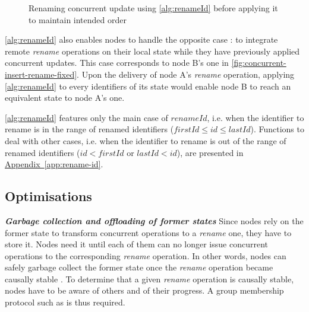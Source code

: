\documentclass[10pt,journal,compsoc]{IEEEtran}
\let\MYoriglatexcaption\caption
\renewcommand{\caption}[2][\relax]{\MYoriglatexcaption[#2]{#2}}
\newcommand{\refappendix}[1]{\hyperref[#1]{Appendix~\ref*{#1}}} %
\newcommand{\ie}{i.e. }
\newcommand{\headerparagraph}[1]{\textbf{\emph{#1}}\quad}
\newcommand{\trm}[1]{\mathit{#1}}
\begin{document}
\begin{figure}[t!]
\begin{tikzpicture}
    \end{tikzpicture}
    \caption{Renaming concurrent update using \autoref{alg:renameId} before applying it to maintain intended order}
    \label{fig:concurrent-insert-rename-fixed}
\end{figure}

\autoref{alg:renameId} also enables nodes to handle the opposite case : to integrate remote \emph{rename} operations on their local state while they have previously applied concurrent updates.
This case corresponds to node B's one in \autoref{fig:concurrent-insert-rename-fixed}.
Upon the delivery of node A's \emph{rename} operation, applying \autoref{alg:renameId} to every identifiers of its state would enable node B to reach an equivalent state to node A's one.

\autoref{alg:renameId} features only the main case of $\trm{renameId}$, \ie when the identifier to rename is in the range of renamed identifiers ($\trm{firstId} \leq \trm{id} \leq \trm{lastId}$).
Functions to deal with other cases, \ie when the identifier to rename is out of the range of renamed identifiers ($\trm{id} < \trm{firstId}$ or $\trm{lastId} < \trm{id}$), are presented in \refappendix{app:rename-id}.

\subsection{Optimisations}

\label{sec:optimisations}


\headerparagraph{Garbage collection and offloading of former states}
%
Since nodes rely on the former state to transform concurrent operations to a \emph{rename} one, they have to store it.
Nodes need it until each of them can no longer issue concurrent operations to the corresponding \emph{rename} operation.
In other words, nodes can safely garbage collect the former state once the \emph{rename} operation became causally stable \cite{10.1007/978-3-662-43352-2_11}.
To determine that a given \emph{rename} operation is causally stable, nodes have to be aware of others and of their progress.
A group membership protocol such as \cite{swim2002,lifeguard2018} is thus required.
\end{document}
